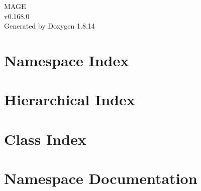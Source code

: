 \documentclass[twoside]{book}
\newcommand{\+}{\discretionary{\mbox{\scriptsize$\hookleftarrow$}}{}{}}
\newcommand{\clearemptydoublepage}{%
  \newpage{\pagestyle{empty}\cleardoublepage}%
}
\begin{document}
\hypersetup{pageanchor=false,
             bookmarksnumbered=true,
             pdfencoding=unicode
            }
\begin{titlepage}
\vspace*{7cm}
\begin{center}%
{\Large M\+A\+GE \\[1ex]\large v0.\+168.\+0 }\\
\vspace*{1cm}
{\large Generated by Doxygen 1.8.14}\\
\end{center}
\end{titlepage}
\clearemptydoublepage
{}
\tableofcontents
\clearemptydoublepage
{}
\hypersetup{pageanchor=true}

\chapter{Namespace Index}

\chapter{Hierarchical Index}

\chapter{Class Index}

\chapter{Namespace Documentation}
























\end{document}
